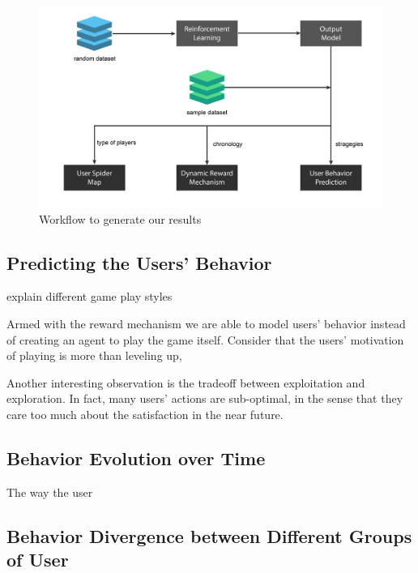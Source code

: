 \documentclass{sigchi}
\begin{document}
\begin{figure}[t]
    \centering
    \includegraphics[width=\textwidth]{figs/results.jpg}
    \caption{Workflow to generate our results}
    \label{fig:results}
\end{figure}


\subsection{Predicting the Users' Behavior}

explain different game play styles

Armed with the reward mechanism we are able to model users' behavior instead of creating an agent to play the game itself. 
Consider that the users' motivation of playing is more than leveling up, 

Another interesting observation is the tradeoff between exploitation and exploration. In fact, many users' actions are sub-optimal, in the sense that they care too much about the satisfaction in the near future.

\subsection{Behavior Evolution over Time}

The way the user 

\subsection{Behavior Divergence between Different Groups of User}




\end{document}
